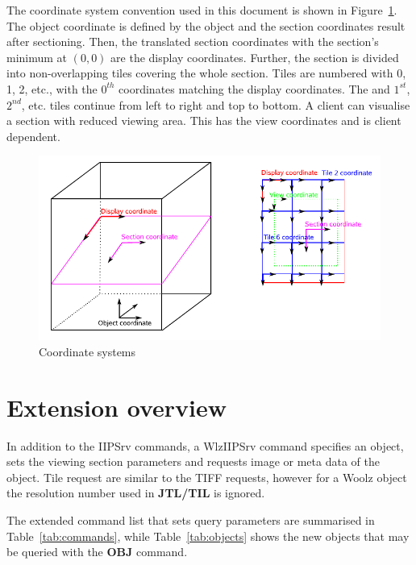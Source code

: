 \documentclass[11pt]{article}
\newcommand{\com}[1]{\textbf{#1}}
\begin{document}
The coordinate system convention used in this document is shown in
Figure~\ref{fig:coordinates}.
The object coordinate is defined by the object and the section coordinates
result after sectioning. Then, the translated section coordinates with the
section's minimum at $(0,0)$ are the display coordinates.
Further, the section is divided into non-overlapping tiles covering the
whole section.
Tiles are numbered with 0, 1, 2, etc., with the $0^{th}$ coordinates matching
the display coordinates.
The  and $1^{st}$,$2^{nd}$, etc. tiles continue from left to right and top to
bottom.
A client can visualise a section with reduced viewing area.
This has the view coordinates and is client dependent.
\begin{figure}[!htb]
\includegraphics[width=\linewidth]{coordinates}
\caption{Coordinate systems}
\label{fig:coordinates}
\end{figure}

\section{Extension overview}

In addition to the IIPSrv commands, a WlzIIPSrv command specifies an object,
sets the viewing section parameters and requests  image or meta data of the
object.
Tile request are similar to the TIFF requests,
however for a Woolz object the resolution number used in \com{JTL/TIL} is
ignored.


The extended command list that sets query parameters are summarised in
Table~\ref{tab:commands}, while Table~\ref{tab:objects} shows the new objects
that may be queried with the \com{OBJ} command.
\end{document}
